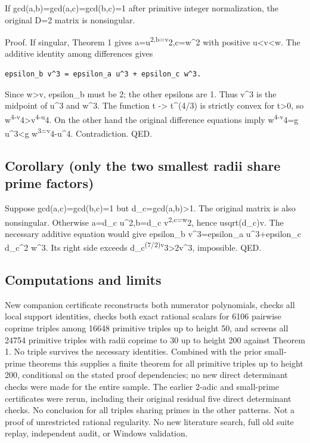 \documentclass[
  10pt,
]{article}
\begin{document}
If gcd(a,b)=gcd(a,c)=gcd(b,c)=1 after primitive integer normalization,
the original D=2 matrix is nonsingular.

Proof. If singular, Theorem 1 gives a=u\textsuperscript{2,b=v}2,c=w\^{}2
with positive u\textless v\textless w. The additive identity among
differences gives

\begin{verbatim}
epsilon_b v^3 = epsilon_a u^3 + epsilon_c w^3.
\end{verbatim}

Since w\textgreater v, epsilon\_b must be 2; the other epsilons are 1.
Thus v\^{}3 is the midpoint of u\^{}3 and w\^{}3. The function t
-\textgreater{} t\^{}(4/3) is strictly convex for t\textgreater0, so
w\textsuperscript{4-v}4\textgreater v\textsuperscript{4-u}4. On the
other hand the original difference equations imply
w\textsuperscript{4-v}4=g u\^{}3\textless g
w\textsuperscript{3=v}4-u\^{}4. Contradiction. QED.

\subsection{Corollary (only the two smallest radii share prime
factors)}\label{corollary-only-the-two-smallest-radii-share-prime-factors}

Suppose gcd(a,c)=gcd(b,c)=1 but d\_c=gcd(a,b)\textgreater1. The original
matrix is also nonsingular. Otherwise a=d\_c u\^{}2,b=d\_c
v\textsuperscript{2,c=w}2, hence usqrt(d\_c)v. The necessary additive
equation would give epsilon\_b v\^{}3=epsilon\_a u\^{}3+epsilon\_c
d\_c\^{}2 w\^{}3. Its right side exceeds
d\_c\textsuperscript{(7/2)v}3\textgreater2v\^{}3, impossible. QED.

\subsection{Computations and limits}\label{computations-and-limits}

New companion certificate reconstructs both numerator polynomials,
checks all local support identities, checks both exact rational scalars
for 6106 pairwise coprime triples among 16648 primitive triples up to
height 50, and screens all 24754 primitive triples with radii coprime to
30 up to height 200 against Theorem 1. No triple survives the necessary
identities. Combined with the prior small-prime theorems this supplies a
finite theorem for all primitive triples up to height 200, conditional
on the stated proof dependencies; no new direct determinant checks were
made for the entire sample. The earlier 2-adic and small-prime
certificates were rerun, including their original residual five direct
determinant checks. No conclusion for all triples sharing primes in the
other patterns. Not a proof of unrestricted rational regularity. No new
literature search, full old suite replay, independent audit, or Windows
validation.
\end{document}

